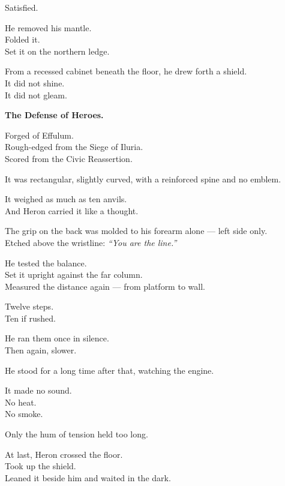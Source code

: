 \documentclass[9pt]{article}
\begin{document}
Satisfied.

\vspace{1em}

He removed his mantle.\\
Folded it.\\
Set it on the northern ledge.

From a recessed cabinet beneath the floor, he drew forth a shield.\\
It did not shine.\\
It did not gleam.

\textbf{The Defense of Heroes.}

Forged of Effulum.\\
Rough-edged from the Siege of Iluria.\\
Scored from the Civic Reassertion.

It was rectangular, slightly curved, with a reinforced spine and no emblem.

It weighed as much as ten anvils.\\
And Heron carried it like a thought.

The grip on the back was molded to his forearm alone — left side only.\\
Etched above the wristline: \textit{“You are the line.”}

He tested the balance.\\
Set it upright against the far column.\\
Measured the distance again — from platform to wall.

Twelve steps.\\
Ten if rushed.

He ran them once in silence.\\
Then again, slower.

He stood for a long time after that, watching the engine.

\vspace{1em}

It made no sound.\\
No heat.\\
No smoke.

Only the hum of tension held too long.

\vspace{1em}

At last, Heron crossed the floor.\\
Took up the shield.\\
Leaned it beside him and waited in the dark.

\vspace{1em}
\end{document}
